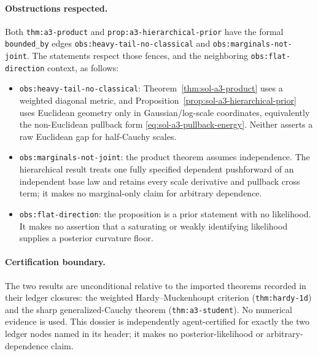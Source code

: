 \documentclass[../main.tex]{subfiles}
\begin{document}
\paragraph{Obstructions respected.}
Both \texttt{thm:a3-product} and \texttt{prop:a3-hierarchical-prior} have the formal
\texttt{bounded\_by} edges \texttt{obs:heavy-tail-no-classical} and
\texttt{obs:marginals-not-joint}.  The statements respect those fences, and the neighboring
\texttt{obs:flat-direction} context, as follows:
\begin{itemize}[leftmargin=2em]
\item \texttt{obs:heavy-tail-no-classical}: Theorem~\ref{thm:sol-a3-product} uses a weighted diagonal
  metric, and Proposition~\ref{prop:sol-a3-hierarchical-prior} uses Euclidean geometry only in
  Gaussian/log-scale coordinates, equivalently the non-Euclidean pullback form
  \eqref{eq:sol-a3-pullback-energy}.  Neither asserts a raw Euclidean gap for half-Cauchy scales.
\item \texttt{obs:marginals-not-joint}: the product theorem assumes independence.  The hierarchical
  result treats one fully specified dependent pushforward of an independent base law and retains
  every scale derivative and pullback cross term; it makes no marginal-only claim for arbitrary
  dependence.
\item \texttt{obs:flat-direction}: the proposition is a prior statement with no likelihood.  It makes no
  assertion that a saturating or weakly identifying likelihood supplies a posterior curvature
  floor.
\end{itemize}

\paragraph{Certification boundary.}
The two results are unconditional relative to the imported theorems recorded in their ledger
closures: the weighted Hardy--Muckenhoupt criterion (\texttt{thm:hardy-1d}) and the sharp
generalized-Cauchy theorem (\texttt{thm:a3-student}).  No numerical evidence is used.
This dossier is independently agent-certified for exactly the two ledger nodes named in its
header; it makes no posterior-likelihood or arbitrary-dependence claim.
\end{document}
